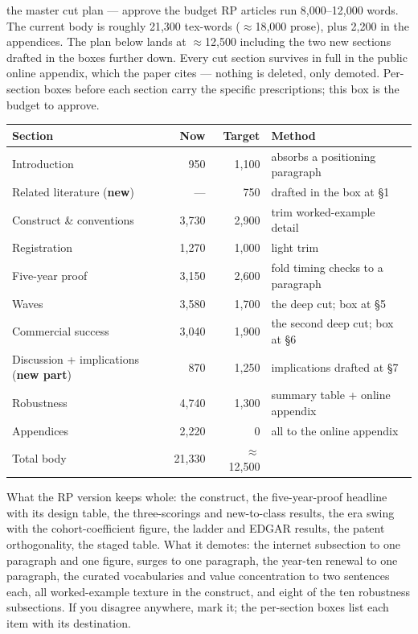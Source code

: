 \begin{ericbox}{the master cut plan --- approve the budget}
RP articles run 8,000--12,000 words. The current body is roughly 21,300
tex-words ($\approx$18,000 prose), plus 2,200 in the appendices. The plan
below lands at $\approx$12,500 including the two new sections drafted in
the boxes further down. Every cut section survives in full in the public
online appendix, which the paper cites --- nothing is deleted, only
demoted. Per-section boxes before each section carry the specific
prescriptions; this box is the budget to approve.

\medskip
\begin{center}\small
\begin{tabular}{lrrl}
\toprule
Section & Now & Target & Method \\
\midrule
Introduction & 950 & 1{,}100 & absorbs a positioning paragraph \\
Related literature (\textbf{new}) & --- & 750 & drafted in the box at \S1 \\
Construct \& conventions & 3{,}730 & 2{,}900 & trim worked-example detail \\
Registration & 1{,}270 & 1{,}000 & light trim \\
Five-year proof & 3{,}150 & 2{,}600 & fold timing checks to a paragraph \\
Waves & 3{,}580 & 1{,}700 & the deep cut; box at \S5 \\
Commercial success & 3{,}040 & 1{,}900 & the second deep cut; box at \S6 \\
Discussion + implications (\textbf{new part}) & 870 & 1{,}250 & implications drafted at \S7 \\
Robustness & 4{,}740 & 1{,}300 & summary table + online appendix \\
Appendices & 2{,}220 & 0 & all to the online appendix \\
\midrule
Total body & 21{,}330 & $\approx$12{,}500 & \\
\bottomrule
\end{tabular}
\end{center}

\medskip\noindent What the RP version keeps whole: the construct, the
five-year-proof headline with its design table, the three-scorings and
new-to-class results, the era swing with the cohort-coefficient figure,
the ladder and EDGAR results, the patent orthogonality, the staged table.
What it demotes: the internet subsection to one paragraph and one figure,
surges to one paragraph, the year-ten renewal to one paragraph, the
curated vocabularies and value concentration to two sentences each, all
worked-example texture in the construct, and eight of the ten robustness
subsections. If you disagree anywhere, mark it; the per-section boxes list
each item with its destination.
\end{ericbox}
